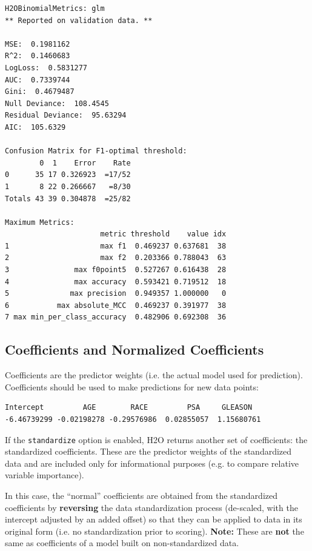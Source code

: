 \begin{lstlisting}[style=output]
H2OBinomialMetrics: glm
** Reported on validation data. **

MSE:  0.1981162
R^2:  0.1460683
LogLoss:  0.5831277
AUC:  0.7339744
Gini:  0.4679487
Null Deviance:  108.4545
Residual Deviance:  95.63294
AIC:  105.6329

Confusion Matrix for F1-optimal threshold:
        0  1    Error    Rate
0      35 17 0.326923  =17/52
1       8 22 0.266667   =8/30
Totals 43 39 0.304878  =25/82

Maximum Metrics:
                      metric threshold    value idx
1                     max f1  0.469237 0.637681  38
2                     max f2  0.203366 0.788043  63
3               max f0point5  0.527267 0.616438  28
4               max accuracy  0.593421 0.719512  18
5              max precision  0.949357 1.000000   0
6           max absolute_MCC  0.469237 0.391977  38
7 max min_per_class_accuracy  0.482906 0.692308  36
\end{lstlisting}

\subsection{Coefficients and Normalized Coefficients}

Coefficients are the predictor weights (i.e. the actual model used for prediction).  Coefficients should be used to
make predictions for new data points:



\begin{lstlisting}[style=output]
  Intercept         AGE        RACE         PSA     GLEASON 
-6.46739299 -0.02198278 -0.29576986  0.02855057  1.15680761 
\end{lstlisting}

If the \texttt{standardize} option is enabled, H2O returns another set of coefficients: the standardized
coefficients. These are the predictor weights of the standardized data and are included only for informational
purposes (e.g. to compare relative variable importance). 

In this case, the ``normal'' coefficients are obtained
from the standardized coefficients by \textbf{reversing} the data standardization process (de-scaled, with the
intercept adjusted by an added offset) so that they can be applied to data in its original form (i.e. no
standardization prior to scoring). \textbf{Note:} These are \textbf{not} the same as coefficients of a model built
on non-standardized data.

